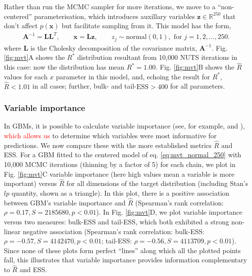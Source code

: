 \documentclass{article}
\begin{document}
Rather than run the MCMC sampler for more iterations, we move to a ``non-centered'' parameterisation, which introduces auxillary variables $\boldsymbol{z}\in\mathbb{R}^{250}$ that don't affect $p(\boldsymbol{x})$ but facilitate sampling from it. This model has the form,
%
\begin{align}
\boldsymbol{A}^{-1} = \boldsymbol{L}\boldsymbol{L}^T,\qquad
\boldsymbol{x} = \boldsymbol{L} \boldsymbol{z},\qquad
z_j\sim \text{normal}(0, 1), \text{ for } j = 1,2,...,250.
\end{align}
%
where $\boldsymbol{L}$ is the Cholesky decomposition of the covariance matrix, $\boldsymbol{A}^{-1}$. Fig. \ref{fig:mvt}A shows the $R^*$ distribution resultant from 10,000 NUTS iterations in this case: now the distribution has mean $R^*=1.00$. Fig. \ref{fig:mvt}B shows the $\widehat{R}$ values for each $x$ parameter in this model, and, echoing the result for $R^*$, $\widehat{R}<1.01$ in all cases; further, bulk- and tail-$\text{ESS}>400$ for all parameters.

\subsubsection{Variable importance}\label{sec:multivariate_normal_varimportance}
In GBMs, it is possible to calculate variable importance (see, for example, \cite{friedman2001greedy} and \cite{greenwell2019package}), \textcolor{red}{which allows us} to determine which variables were most informative for predictions. We now compare these with the more established metrics $\widehat{R}$ and ESS. For a GBM fitted to the centered model of eq. \eqref{eq:mvt_normal_250} with 10,000 MCMC iterations (thinning by a factor of 5) for each chain, we plot in Fig. \ref{fig:mvt}C variable importance (here high values mean a variable is more important) versus $\widehat{R}$ for all dimensions of the target distribution (including Stan's $lp$ quantity, shown as a triangle). In this plot, there is a positive association between GBM's variable importance and $\widehat{R}$ (Spearman's rank correlation: $\rho=0.17, S=2185680, p<0.01$). In Fig.  \ref{fig:mvt}D, we plot variable importance versus two measures: bulk-ESS and tail-ESS, which both exhibited a strong non-linear negative association (Spearman's rank correlation: bulk-ESS: $\rho=-0.57, S=4142470, p<0.01$; tail-ESS: $\rho=-0.56, S=4113709, p<0.01$). Since none of these plots form perfect ``lines'' along which all the plotted points fall, this illustrates that variable importance provides information complementary to $\widehat{R}$ and ESS.
\end{document}
